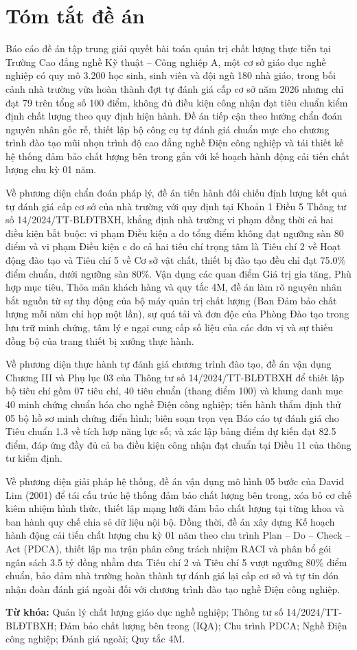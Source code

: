 \section*{Tóm tắt đề án}

Báo cáo đề án tập trung giải quyết bài toán quản trị chất lượng thực tiễn tại Trường Cao đẳng nghề Kỹ thuật -- Công nghiệp A, một cơ sở giáo dục nghề nghiệp có quy mô 3.200 học sinh, sinh viên và đội ngũ 180 nhà giáo, trong bối cảnh nhà trường vừa hoàn thành đợt tự đánh giá cấp cơ sở năm 2026 nhưng chỉ đạt 79 trên tổng số 100 điểm, không đủ điều kiện công nhận đạt tiêu chuẩn kiểm định chất lượng theo quy định hiện hành. Đề án tiếp cận theo hướng chẩn đoán nguyên nhân gốc rễ, thiết lập bộ công cụ tự đánh giá chuẩn mực cho chương trình đào tạo mũi nhọn trình độ cao đẳng nghề Điện công nghiệp và tái thiết kế hệ thống đảm bảo chất lượng bên trong gắn với kế hoạch hành động cải tiến chất lượng chu kỳ 01 năm.

Về phương diện chẩn đoán pháp lý, đề án tiến hành đối chiếu định lượng kết quả tự đánh giá cấp cơ sở của nhà trường với quy định tại Khoản 1 Điều 5 Thông tư số 14/2024/TT-BLĐTBXH, khẳng định nhà trường vi phạm đồng thời cả hai điều kiện bắt buộc: vi phạm Điều kiện a do tổng điểm không đạt ngưỡng sàn 80 điểm và vi phạm Điều kiện c do cả hai tiêu chí trọng tâm là Tiêu chí 2 về Hoạt động đào tạo và Tiêu chí 5 về Cơ sở vật chất, thiết bị đào tạo đều chỉ đạt 75.0\% điểm chuẩn, dưới ngưỡng sàn 80\%. Vận dụng các quan điểm Giá trị gia tăng, Phù hợp mục tiêu, Thỏa mãn khách hàng và quy tắc 4M, đề án làm rõ nguyên nhân bắt nguồn từ sự thụ động của bộ máy quản trị chất lượng (Ban Đảm bảo chất lượng mỗi năm chỉ họp một lần), sự quá tải và đơn độc của Phòng Đào tạo trong lưu trữ minh chứng, tâm lý e ngại cung cấp số liệu của các đơn vị và sự thiếu đồng bộ của trang thiết bị xưởng thực hành.

Về phương diện thực hành tự đánh giá chương trình đào tạo, đề án vận dụng Chương III và Phụ lục 03 của Thông tư số 14/2024/TT-BLĐTBXH để thiết lập bộ tiêu chí gồm 07 tiêu chí, 40 tiêu chuẩn (thang điểm 100) và khung danh mục 40 minh chứng chuẩn hóa cho nghề Điện công nghiệp; tiến hành thẩm định thử 05 bộ hồ sơ minh chứng điển hình; biên soạn trọn vẹn Báo cáo tự đánh giá cho Tiêu chuẩn 1.3 về tích hợp năng lực số; và xác lập bảng điểm dự kiến đạt 82.5 điểm, đáp ứng đầy đủ cả ba điều kiện công nhận đạt chuẩn tại Điều 11 của thông tư kiểm định.

Về phương diện giải pháp hệ thống, đề án vận dụng mô hình 05 bước của David Lim (2001) để tái cấu trúc hệ thống đảm bảo chất lượng bên trong, xóa bỏ cơ chế kiêm nhiệm hình thức, thiết lập mạng lưới đảm bảo chất lượng tại từng khoa và ban hành quy chế chia sẻ dữ liệu nội bộ. Đồng thời, đề án xây dựng Kế hoạch hành động cải tiến chất lượng chu kỳ 01 năm theo chu trình Plan -- Do -- Check -- Act (PDCA), thiết lập ma trận phân công trách nhiệm RACI và phân bổ gói ngân sách 3.5 tỷ đồng nhằm đưa Tiêu chí 2 và Tiêu chí 5 vượt ngưỡng 80\% điểm chuẩn, bảo đảm nhà trường hoàn thành tự đánh giá lại cấp cơ sở và tự tin đón nhận đoàn đánh giá ngoài đối với chương trình đào tạo nghề Điện công nghiệp.

\vspace{0.5cm}
\noindent\textbf{Từ khóa:} Quản lý chất lượng giáo dục nghề nghiệp; Thông tư số 14/2024/TT-BLĐTBXH; Đảm bảo chất lượng bên trong (IQA); Chu trình PDCA; Nghề Điện công nghiệp; Đánh giá ngoài; Quy tắc 4M.
